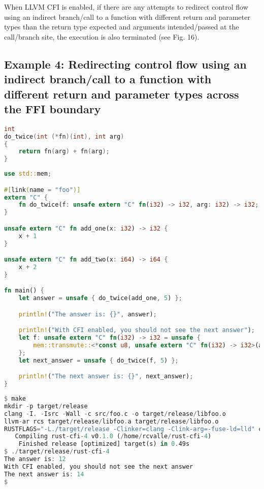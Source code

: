 \documentclass{article}
\begin{document}
When LLVM CFI is enabled, if there are any attempts to redirect control flow using an indirect branch/call to a function with different return and parameter types than the return type expected and arguments intended/passed at the call/branch site, the execution is also terminated (see Fig. 16).


\subsection{Example 4: Redirecting control flow using an indirect branch/call to a function with different return and parameter types across the FFI boundary}

\begin{lstlisting}[language=C, caption={Example C library.}]
int
do_twice(int (*fn)(int), int arg)
{
    return fn(arg) + fn(arg);
}
\end{lstlisting}

\begin{lstlisting}[language=Rust, caption={Redirecting control flow using an indirect branch/call to a function with different return and parameter types than the return type expected and arguments intended/passed in the call/branch site, across the FFI boundary.}]
use std::mem;

#[link(name = "foo")]
extern "C" {
    fn do_twice(f: unsafe extern "C" fn(i32) -> i32, arg: i32) -> i32;
}

unsafe extern "C" fn add_one(x: i32) -> i32 {
    x + 1
}

unsafe extern "C" fn add_two(x: i64) -> i64 {
    x + 2
}

fn main() {
    let answer = unsafe { do_twice(add_one, 5) };

    println!("The answer is: {}", answer);

    println!("With CFI enabled, you should not see the next answer");
    let f: unsafe extern "C" fn(i32) -> i32 = unsafe {
        mem::transmute::<*const u8, unsafe extern "C" fn(i32) -> i32>(add_two as *const u8)
    };
    let next_answer = unsafe { do_twice(f, 5) };

    println!("The next answer is: {}", next_answer);
}
\end{lstlisting}

\begin{lstlisting}[language=Rust, caption={Build and execution of Figs. 17–18 with LLVM CFI disabled.}]
$ make
mkdir -p target/release
clang -I. -Isrc -Wall -c src/foo.c -o target/release/libfoo.o
llvm-ar rcs target/release/libfoo.a target/release/libfoo.o
RUSTFLAGS="-L./target/release -Clinker=clang -Clink-arg=-fuse-ld=lld" cargo build --release
   Compiling rust-cfi-4 v0.1.0 (/home/rcvalle/rust-cfi-4)
    Finished release [optimized] target(s) in 0.49s
$ ./target/release/rust-cfi-4
The answer is: 12
With CFI enabled, you should not see the next answer
The next answer is: 14
$
\end{lstlisting}
\end{document}
